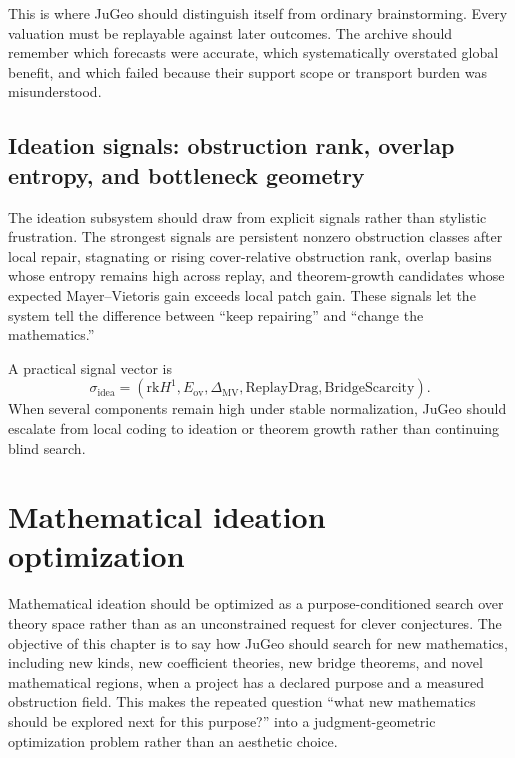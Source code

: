\documentclass[11pt]{report}
\begin{document}
This is where JuGeo should distinguish itself from ordinary brainstorming. Every valuation must be replayable against later outcomes. The archive should remember which forecasts were accurate, which systematically overstated global benefit, and which failed because their support scope or transport burden was misunderstood.

\section{Ideation signals: obstruction rank, overlap entropy, and bottleneck geometry}
The ideation subsystem should draw from explicit signals rather than stylistic frustration. The strongest signals are persistent nonzero obstruction classes after local repair, stagnating or rising cover-relative obstruction rank, overlap basins whose entropy remains high across replay, and theorem-growth candidates whose expected Mayer--Vietoris gain exceeds local patch gain. These signals let the system tell the difference between “keep repairing” and “change the mathematics.”

A practical signal vector is
\[
\sigma_{\mathrm{idea}} = (\mathrm{rk}H^1, E_{\mathrm{ov}}, \Delta_{\mathrm{MV}}, \mathrm{ReplayDrag}, \mathrm{BridgeScarcity}).
\]
When several components remain high under stable normalization, JuGeo should escalate from local coding to ideation or theorem growth rather than continuing blind search.

\chapter{Mathematical ideation optimization}
Mathematical ideation should be optimized as a purpose-conditioned search over theory space rather than as an unconstrained request for clever conjectures. The objective of this chapter is to say how JuGeo should search for new mathematics, including new kinds, new coefficient theories, new bridge theorems, and novel mathematical regions, when a project has a declared purpose and a measured obstruction field. This makes the repeated question ``what new mathematics should be explored next for this purpose?'' into a judgment-geometric optimization problem rather than an aesthetic choice.
\end{document}
